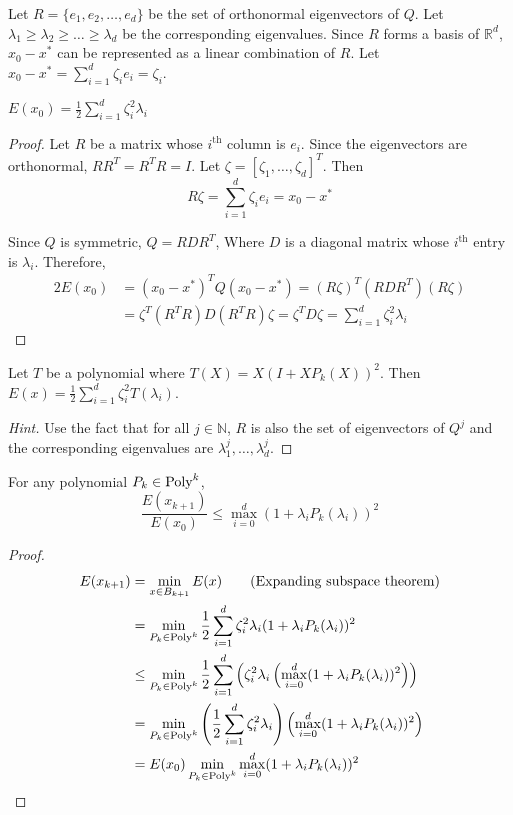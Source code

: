 Let $R = \{e_1, e_2, \ldots, e_d\}$ be the set of orthonormal eigenvectors of $Q$.
Let $\lambda_1 \ge \lambda_2 \ge \ldots \ge \lambda_d$ be the corresponding eigenvalues.
Since $R$ forms a basis of $\mathbb{R}^d$, $x_0 - x^*$ can be represented as a linear combination of $R$.
Let $x_0 - x^* = \sum_{i=1}^d \zeta_i e_i = \zeta_i$.

\begin{lemma}
$E(x_0) = \frac{1}{2} \sum_{i=1}^d \zeta_i^2 \lambda_i$
\end{lemma}
\begin{proof}
Let $R$ be a matrix whose $i^{\textrm{th}}$ column is $e_i$.
Since the eigenvectors are orthonormal, $RR^T = R^TR = I$.
Let $\zeta = [\zeta_1, \ldots, \zeta_d]^T$. Then
\[ R\zeta = \sum_{i=1}^d \zeta_i e_i = x_0 - x^* \]

Since $Q$ is symmetric, $Q = RDR^T$,
Where $D$ is a diagonal matrix whose $i^{\textrm{th}}$ entry is $\lambda_i$.
Therefore,
\begin{align*}
2E(x_0) &= (x_0 - x^*)^T Q (x_0 - x^*) = (R\zeta)^T(RDR^T)(R\zeta)
\\ &= \zeta^T (R^TR) D (R^TR) \zeta = \zeta^T D \zeta = \sum_{i=1}^d \zeta_i^2 \lambda_i
\end{align*}
\end{proof}

\begin{lemma}[Homework]
Let $T$ be a polynomial where $T(X) = X(I + XP_k(X))^2$. Then
$E(x) = \frac{1}{2} \sum_{i=1}^d \zeta_i^2 T(\lambda_i)$.
\end{lemma}
\begin{proof}[Hint]
Use the fact that for all $j \in \mathbb{N}$,
$R$ is also the set of eigenvectors of $Q^j$
and the corresponding eigenvalues are $\lambda_1^j, \ldots, \lambda_d^j$.
\end{proof}

\begin{lemma}
For any polynomial $P_k \in \textrm{Poly}^{k}$,
\[ \frac{E(x_{k+1})}{E(x_0)} \le \max_{i=0}^d (1 + \lambda_i P_k(\lambda_i))^2 \]
\end{lemma}
\begin{proof}
\begin{align*}
E(x_{k+1}) &= \min_{x \in B_{k+1}} E(x)  \tag{Expanding subspace theorem}
\\ &= \min_{P_k \in \textrm{Poly}^{k}} \frac{1}{2} \sum_{i=1}^d \zeta_i^2 \lambda_i(1 + \lambda_iP_k(\lambda_i))^2
\\ &\le \min_{P_k \in \textrm{Poly}^{k}} \frac{1}{2} \sum_{i=1}^d \left(\zeta_i^2 \lambda_i
    \left(\max_{i=0}^d (1 + \lambda_i P_k(\lambda_i))^2\right)\right)
\\ &= \min_{P_k \in \textrm{Poly}^{k}} \left( \frac{1}{2} \sum_{i=1}^d \zeta_i^2 \lambda_i \right)
    \left(\max_{i=0}^d (1 + \lambda_i P_k(\lambda_i))^2\right)
\\ &= E(x_0) \min_{P_k \in \textrm{Poly}^{k}} \max_{i=0}^d (1 + \lambda_i P_k(\lambda_i))^2
\end{align*}
\end{proof}

